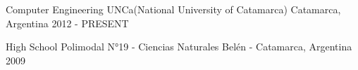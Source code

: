 

\begin{cventries}

  \cventry
    {Computer Engineering} %
    {UNCa(National University of Catamarca)} %
    {Catamarca, Argentina} %
    {2012 - PRESENT} %
    {
      \begin{cvitems} %
      \end{cvitems}
    }

  \cventry
  {High School} %
  {Polimodal N°19 - Ciencias Naturales} %
  {Belén - Catamarca, Argentina} %
  {2009} %
  {
    \begin{cvitems} %
    \end{cvitems}
  }
\end{cventries}

